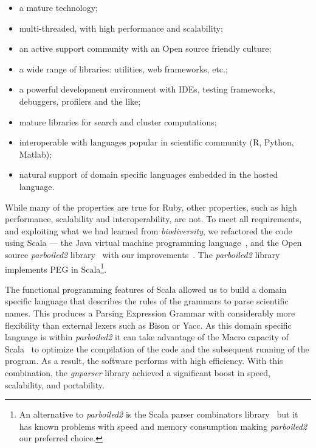 \documentclass{bmcart}
\begin{document}
\begin{itemize}

    \item a mature technology;

    \item multi-threaded, with high performance and scalability;

    \item an active support community with an Open source friendly culture;

    \item a wide range of libraries: utilities, web frameworks, etc.;

    \item a powerful development environment with IDEs, testing frameworks,
      debuggers, profilers and the like;

    \item mature libraries for search and cluster computations;

    \item interoperable with languages popular in scientific community (R,
      Python, Matlab);

    \item natural support of domain specific languages embedded in the hosted
      language.

\end{itemize}

While many of the properties are true for Ruby, other properties, such as high performance, scalability and interoperability, are not. To meet all requirements, and exploiting what we had learned from \textit{biodiversity}, we refactored the code using Scala --- the Java virtual machine programming language~\cite{odersky2004overview}, and the Open source \textit{parboiled2} library~\cite{parboiled2, Myltsev:inpress-a} with our improvements~\cite{parboiled2-gna}. The \textit{parboiled2} library implements PEG in Scala\footnote{An alternative to \textit{parboiled2} is the Scala parser combinators library~\cite{moors2008parser} but it has known problems with speed and memory consumption making \textit{parboiled2} our preferred choice.}.

The functional programming features of Scala allowed us to build a domain specific language that describes the rules of the grammars to parse scientific names. This produces a Parsing Expression Grammar with considerably more flexibility than external lexers such as Bison or Yacc. As this domain specific language is within \textit{parboiled2} it can take advantage of the Macro capacity of Scala~\cite{Burmako:2013:SML:2489837.2489840} to optimize the compilation of the code and the subsequent running of the program. As a result, the software performs with high efficiency. With this combination, the \textit{gnparser} library achieved a significant boost in speed, scalability, and portability.
\end{document}
